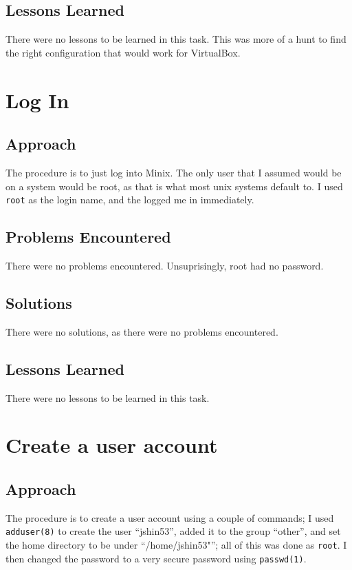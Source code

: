 \documentclass[11pt]{article}
\begin{document}
\subsection{Lessons Learned}
There were no lessons to be learned in this task. This was more of a hunt to find the right configuration that would work for {\sc VirtualBox}.

\section{Log In}
\subsection{Approach}
The procedure is to just log into {\sc Minix}. The only user that I assumed would be on a system would be root, as that is what most unix systems default to. I used {\tt root} as the login name, and the logged me in immediately.

\subsection{Problems Encountered}
There were no problems encountered. Unsuprisingly, root had no password.

\subsection{Solutions}
There were no solutions, as there were no problems encountered.

\subsection{Lessons Learned}
There were no lessons to be learned in this task.

\section{Create a user account}
\subsection{Approach}
The procedure is to create a user account using a couple of commands; I used {\tt adduser(8)} to create the user ``jshin53'', added it to the group ``other'', and set the home directory to be under ``/home/jshin53"''; all of this was done as {\tt root}. I then changed the password to a very secure password using {\tt passwd(1)}.
\end{document}

